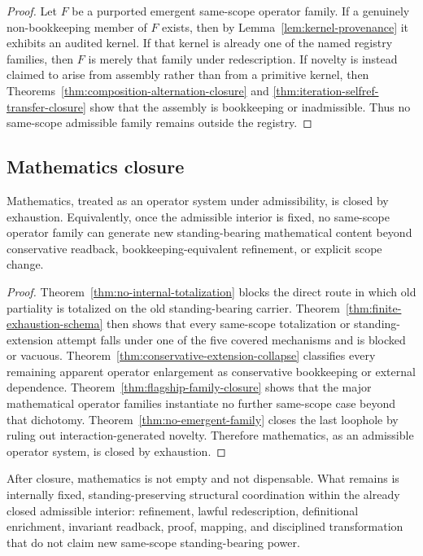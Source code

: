 \begin{proof}
Let $F$ be a purported emergent same-scope operator family. If a genuinely non-bookkeeping member of $F$ exists, then by Lemma~\ref{lem:kernel-provenance} it exhibits an audited kernel. If that kernel is already one of the named registry families, then $F$ is merely that family under redescription. If novelty is instead claimed to arise from assembly rather than from a primitive kernel, then Theorems~\ref{thm:composition-alternation-closure} and \ref{thm:iteration-selfref-transfer-closure} show that the assembly is bookkeeping or inadmissible. Thus no same-scope admissible family remains outside the registry.
\end{proof}

\subsection{Mathematics closure}

\begin{theorem}
\label{thm:mathematics-closure}
Mathematics, treated as an operator system under admissibility, is closed by exhaustion. Equivalently, once the admissible interior is fixed, no same-scope operator family can generate new standing-bearing mathematical content beyond conservative readback, bookkeeping-equivalent refinement, or explicit scope change.
\end{theorem}

\begin{proof}
Theorem~\ref{thm:no-internal-totalization} blocks the direct route in which old partiality is totalized on the old standing-bearing carrier. Theorem~\ref{thm:finite-exhaustion-schema} then shows that every same-scope totalization or standing-extension attempt falls under one of the five covered mechanisms and is blocked or vacuous. Theorem~\ref{thm:conservative-extension-collapse} classifies every remaining apparent operator enlargement as conservative bookkeeping or external dependence. Theorem~\ref{thm:flagship-family-closure} shows that the major mathematical operator families instantiate no further same-scope case beyond that dichotomy. Theorem~\ref{thm:no-emergent-family} closes the last loophole by ruling out interaction-generated novelty. Therefore mathematics, as an admissible operator system, is closed by exhaustion.
\end{proof}

\begin{corollary}
After closure, mathematics is not empty and not dispensable. What remains is internally fixed, standing-preserving structural coordination within the already closed admissible interior: refinement, lawful redescription, definitional enrichment, invariant readback, proof, mapping, and disciplined transformation that do not claim new same-scope standing-bearing power.
\end{corollary}


